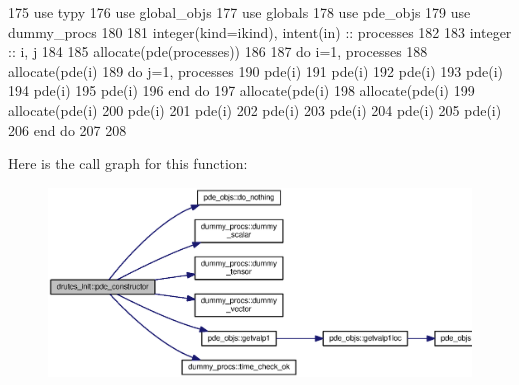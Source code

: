 \begin{DoxyCode}
175       \textcolor{keywordtype}{use }typy
176       \textcolor{keywordtype}{use }global_objs
177       \textcolor{keywordtype}{use }globals
178       \textcolor{keywordtype}{use }pde_objs
179       \textcolor{keywordtype}{use }dummy_procs
180 
181       \textcolor{keywordtype}{integer(kind=ikind)}, \textcolor{keywordtype}{intent(in)} :: processes
182       
183       \textcolor{keywordtype}{integer} :: i, j
184 
185       \textcolor{keyword}{allocate}(pde(processes))
186 
187       \textcolor{keywordflow}{do} i=1, processes
188         \textcolor{keyword}{allocate}(pde(i)%
189         \textcolor{keywordflow}{do} j=1, processes
190           pde(i)%
191           pde(i)%
192           pde(i)%
193           pde(i)%
194           pde(i)%
195           pde(i)%
196 \textcolor{keywordflow}{        end do}  
197         \textcolor{keyword}{allocate}(pde(i)%
198         \textcolor{keyword}{allocate}(pde(i)%
199         \textcolor{keyword}{allocate}(pde(i)%
200         pde(i)%
201         pde(i)%
202         pde(i)%
203         pde(i)%
204         pde(i)%
205         pde(i)%
206 \textcolor{keywordflow}{      end do}
207 
208 
\end{DoxyCode}


Here is the call graph for this function\+:\nopagebreak
\begin{figure}[H]
\begin{center}
\leavevmode
\includegraphics[width=350pt]{namespacedrutes__init_a9acb7782a166647924dd06acb9ab5786_cgraph}
\end{center}
\end{figure}




